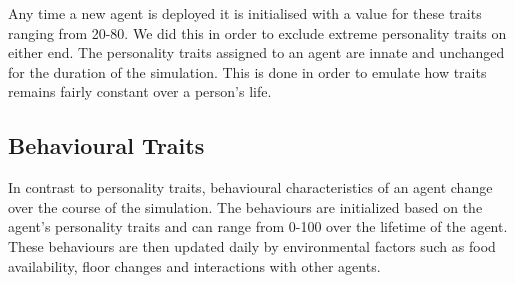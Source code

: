 Any time a new agent is deployed it is initialised with a value for these traits ranging from 20-80. We did this in order to exclude extreme personality traits on either end. The personality traits assigned to an agent are innate and unchanged for the duration of the simulation. This is done in order to emulate how traits remains fairly constant over a person's life.

\subsection{Behavioural Traits}
\label{subsec: Behaviour}
In contrast to personality traits, behavioural characteristics of an agent change over the course of the simulation. The behaviours are initialized based on the agent's personality traits and can range from 0-100 over the lifetime of the agent. These behaviours are then updated daily by environmental factors such as food availability, floor changes and interactions with other agents. 

